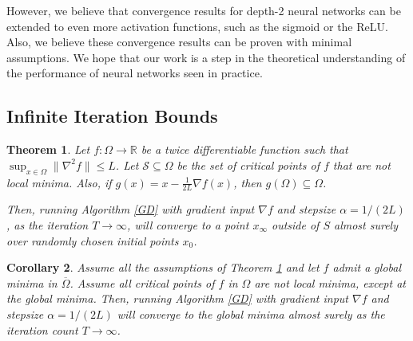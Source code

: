\documentclass{article}
\newtheorem{theorem}{Theorem}[section]
\newtheorem{corollary}[theorem]{Corollary}
\newcommand{\R}{{\mathbb{R}}}
\begin{document}
However, we believe that convergence results for depth-2 neural networks can be extended to even more activation functions, such as the sigmoid or the ReLU. Also, we believe these convergence results can be proven with minimal assumptions. We hope that our work is a step in the theoretical understanding of the performance of neural networks seen in practice.



{\small

}

\newpage
\appendix
% 




% 



































\subsection{Infinite Iteration Bounds} 
\label{InfIter}


\begin{theorem}\cite{lee2016gradient, PanageasP16}\label{convStrict}
  Let $f :\Omega \to \R$ be a twice differentiable function such that
  $\sup_{x \in \Omega} \|\nabla^2 f\| \leq L$. Let
  $\mathcal{S} \subseteq \Omega$ be the set of critical points of $f$
  that are not local minima. Also, if
  $g(x) = x - \frac{1}{2L} \nabla f(x)$, then
  $g(\Omega) \subseteq \Omega$.

  Then, running Algorithm \ref{GD} with gradient input $\nabla f$ and
  stepsize $\alpha = 1/(2L)$, as the iteration $T \to\infty$, will
  converge to a point $x_\infty$ outside of $S$ almost surely over
  randomly chosen initial points $x_0$.
\end{theorem}

\begin{corollary}
Assume all the assumptions of Theorem \ref{convStrict} and let $f$ admit a global minima in $\overline{\Omega}$. Assume all critical points of $f$ in $\Omega$ are not local minima, except at the global minima. Then, running Algorithm \ref{GD} with gradient input $\nabla f$ and stepsize $\alpha = 1/(2L)$ will converge to the global minima almost surely as the iteration count $T \to\infty$.
\end{corollary}
\fi
\end{document}
